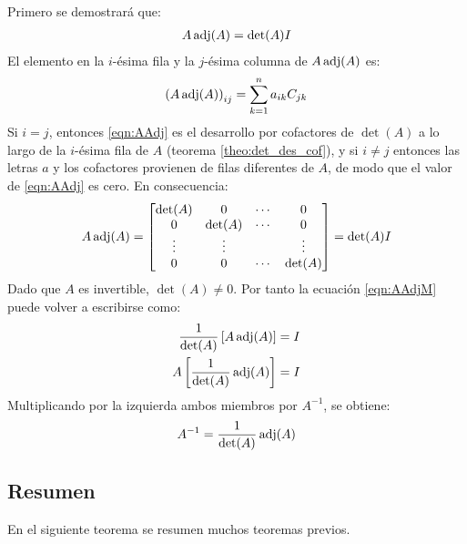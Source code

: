 \documentclass[a4paper,12pt]{article}
\begin{document}
\demo Primero se demostrará que:
\begin{align*}
  A\operatorname*{adj}(A)=\det(A)I
\end{align*}
El elemento en la $i$-ésima fila y la $j$-ésima columna de $A\operatorname*{adj}(A)$ es:
\begin{align}
  \left( A\operatorname*{adj}(A) \right)_{ij}=\sum_{k=1}^n a_{ik}C_{jk}
  \label{eqn:AAdj}
\end{align}
Si $i=j$, entonces \eqref{eqn:AAdj} es el desarrollo por cofactores de
$\det(A)$ a lo largo de la $i$-ésima fila de $A$ (teorema
\ref{theo:det_des_cof}), y si $i\ne j$ entonces las letras $a$ y los
cofactores provienen de filas diferentes de $A$, de modo que el valor de
\eqref{eqn:AAdj} es cero. En consecuencia:
\begin{align*}
  A\operatorname*{adj}(A)=
    \begin{bmatrix}
      \det(A)& 0& \cdots& 0\\
      0& \det(A)& \cdots& 0\\
      \vdots&\vdots &       &\vdots \\
      0& 0& \cdots& \det(A)
    \end{bmatrix}
    = \det(A)I
\end{align*}
Dado que $A$ es invertible, $\det(A)\ne0$. Por tanto la ecuación
\eqref{eqn:AAdjM} puede volver a escribirse como:
\begin{align*}
  \frac{1}{\det(A)}\left[ A\operatorname*{adj}(A) \right]&=I \\
  A\left[ \frac{1}{\det(A)}\operatorname*{adj}(A) \right]&=I
\end{align*}
Multiplicando por la izquierda ambos miembros por $A^{-1}$, se obtiene:
\begin{align*}
    A^{-1}=\frac{1}{\det(A)}\operatorname*{adj}(A)
\end{align*}

\subsection{Resumen}

En el siguiente teorema se resumen muchos teoremas previos.
\end{document}

